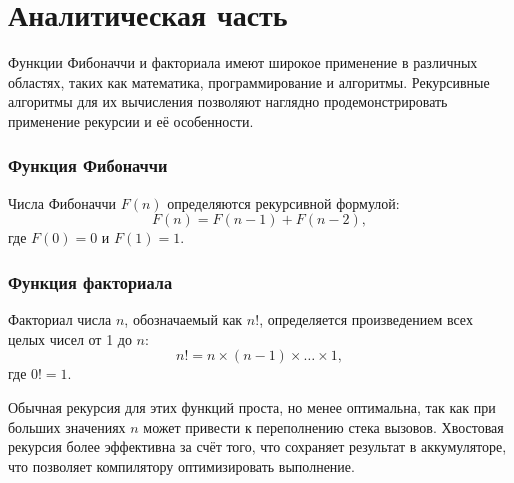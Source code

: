\chapter{Аналитическая часть}

Функции Фибоначчи и факториала имеют широкое применение в различных областях, таких как математика, программирование и алгоритмы. Рекурсивные алгоритмы для их вычисления позволяют наглядно продемонстрировать применение рекурсии и её особенности.

\subsection{Функция Фибоначчи}
Числа Фибоначчи \( F(n) \) определяются рекурсивной формулой:
\begin{equation}
	F(n) = F(n-1) + F(n-2),
\end{equation}
где \( F(0) = 0 \) и \( F(1) = 1 \).

\subsection{Функция факториала}
Факториал числа \( n \), обозначаемый как \( n! \), определяется произведением всех целых чисел от 1 до \( n \):
\begin{equation}
	n! = n \times (n - 1) \times \dots \times 1,
\end{equation}
где \( 0! = 1 \).

Обычная рекурсия для этих функций проста, но менее оптимальна, так как при больших значениях \( n \) может привести к переполнению стека вызовов. Хвостовая рекурсия более эффективна за счёт того, что сохраняет результат в аккумуляторе, что позволяет компилятору оптимизировать выполнение.


\clearpage
